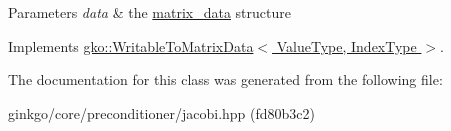 \begin{DoxyParams}{Parameters}
{\em data} & the \hyperlink{structgko_1_1matrix__data}{matrix\+\_\+data} structure \\
\hline
\end{DoxyParams}


Implements \hyperlink{classgko_1_1WritableToMatrixData_a96036c3a4bf4c67fa93002808b8b14e2}{gko\+::\+Writable\+To\+Matrix\+Data$<$ Value\+Type, Index\+Type $>$}.



The documentation for this class was generated from the following file\+:\begin{DoxyCompactItemize}
\item 
ginkgo/core/preconditioner/jacobi.\+hpp (fd80b3c2)\end{DoxyCompactItemize}
